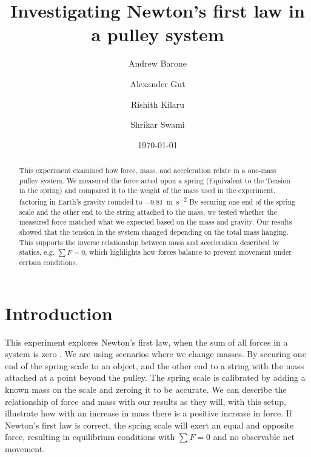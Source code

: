 \documentclass[reprint,amsmath,amssymb,aps]{revtex4-2}
\begin{document}
\title{Investigating Newton's first law in a pulley system}
\author{Andrew Barone}
\author{Alexander Gut}
\author{Rishith Kilaru}
\author{Shrikar Swami}
\date{\today}

\begin{abstract}
This experiment examined how force, mass, and acceleration relate in a one-mass pulley system. We measured the force acted upon a spring (Equivalent to the Tension in the spring) and compared it to the weight of the mass used in the experiment, factoring in Earth's gravity rounded to \qty{-9.81}{\meter\per\second\squared} By securing one end of the spring scale and the other end to the string attached to the mass, we tested whether the measured force matched what we expected based on the mass and gravity. Our results showed that the tension in the system changed depending on the total mass hanging. This supports the inverse relationship between mass and acceleration described by statics, e.g. $\sum F = 0$, which highlights how forces balance to prevent movement under certain conditions. 
\end{abstract}


\maketitle
    
\section{Introduction}
This experiment explores Newton's first law, when the sum of all forces in a system is zero \cite{tipler, barrons}. We are using scenarios where we change masses. By securing one end of the spring scale to an object, and the other end to a string with the mass attached at a point beyond the pulley. The spring scale is calibrated by adding a known mass on the scale and zeroing it to be accurate. We can describe the relationship of force and mass with our results as they will, with this setup, illustrate how with an increase in mass there is a positive increase in force. If Newton's first law is correct, the spring scale will exert an equal and opposite force, resulting in equilibrium conditions with $\sum F = 0$ and no observable net movement.
    
\end{document}
